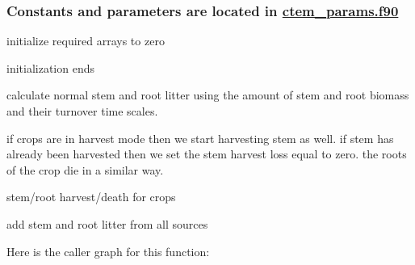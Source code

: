  \subsubsection*{Constants and parameters are located in \hyperlink{ctem__params_8f90}{ctem\+\_\+params.\+f90} }

initialize required arrays to zero

initialization ends 



calculate normal stem and root litter using the amount of stem and root biomass and their turnover time scales.

if crops are in harvest mode then we start harvesting stem as well. if stem has already been harvested then we set the stem harvest loss equal to zero. the roots of the crop die in a similar way.

stem/root harvest/death for crops

add stem and root litter from all sources

Here is the caller graph for this function\+:


